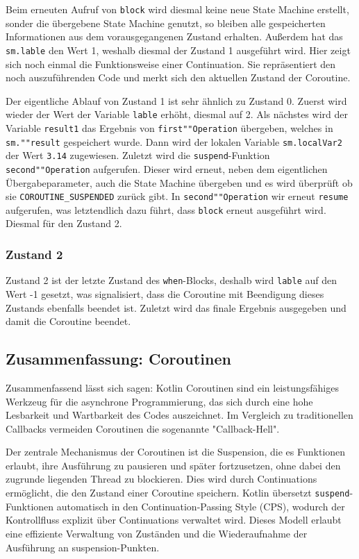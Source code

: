 \documentclass[fontsize=12pt,paper=a4,twoside=semi,parskip=half-,headsepline,headinclude]{scrreprt}
\begin{document}
Beim erneuten Aufruf von \texttt{block} wird diesmal keine neue State Machine erstellt, sonder die übergebene State Machine genutzt, so bleiben alle gespeicherten Informationen aus dem vorausgegangenen Zustand erhalten. Außerdem hat das \texttt{sm.lable} den Wert 1, weshalb diesmal der Zustand 1 ausgeführt wird. Hier zeigt sich noch einmal die Funktionsweise einer Continuation. Sie repräsentiert den noch auszuführenden Code und merkt sich den aktuellen Zustand der Coroutine. 

Der eigentliche Ablauf von Zustand 1 ist sehr ähnlich zu Zustand 0. Zuerst wird wieder der Wert der Variable \texttt{lable} erhöht, diesmal auf 2. Als nächstes wird der Variable \texttt{result1} das Ergebnis von \texttt{first""Operation} übergeben, welches in \texttt{sm.""result} gespeichert wurde. Dann wird der lokalen Variable \texttt{sm.localVar2} der Wert \texttt{3.14} zugewiesen. Zuletzt wird die \texttt{suspend}-Funktion \texttt{second""Operation} aufgerufen. Dieser wird erneut, neben dem eigentlichen Übergabeparameter, auch die State Machine übergeben und es wird überprüft ob sie \texttt{COROUTINE\_SUSPENDED} zurück gibt. In \texttt{second""Operation} wir erneut \texttt{resume} aufgerufen, was letztendlich dazu führt, dass \texttt{block} erneut ausgeführt wird. Diesmal für den Zustand 2.

\subsubsection{Zustand 2}

Zustand 2 ist der letzte Zustand des \texttt{when}-Blocks, deshalb wird \texttt{lable} auf den Wert -1 gesetzt, was signalisiert, dass die Coroutine mit Beendigung dieses Zustands ebenfalls beendet ist. Zuletzt wird das finale Ergebnis ausgegeben und damit die Coroutine beendet.

\subsection{Zusammenfassung: Coroutinen}

Zusammenfassend lässt sich sagen: Kotlin Coroutinen sind ein leistungsfähiges Werkzeug für die asynchrone Programmierung, das sich durch eine hohe Lesbarkeit und Wartbarkeit des Codes auszeichnet. Im Vergleich zu traditionellen Callbacks vermeiden Coroutinen die sogenannte "Callback-Hell".

Der zentrale Mechanismus der Coroutinen ist die Suspension, die es Funktionen erlaubt, ihre Ausführung zu pausieren und später fortzusetzen, ohne dabei den zugrunde liegenden Thread zu blockieren. Dies wird durch Continuations ermöglicht, die den Zustand einer Coroutine speichern. Kotlin übersetzt \texttt{suspend}-Funktionen automatisch in den Continuation-Passing Style (CPS), wodurch der Kontrollfluss explizit über Continuations verwaltet wird. Dieses Modell erlaubt eine effiziente Verwaltung von Zuständen und die Wiederaufnahme der Ausführung an suspension-Punkten.
\end{document}
